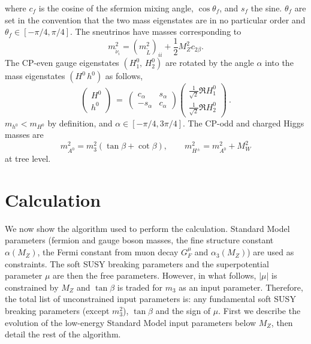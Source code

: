 \documentclass{article}
\def\half{\frac{1}{2}}
\begin{document}
%
where $c_f$ is the cosine of the sfermion mixing angle,
$\cos\theta_f$, and $s_f$ the sine. 
$\theta_f$ are set in the convention that the two mass eigenstates are in no
particular order and $\theta_f \in [-\pi/4, \pi/4]$. The sneutrinos have
masses corresponding to
\begin{equation}
m_{\tilde \nu_i}^2 = (m_{\tilde L}^2)_{ii} + \half M_Z^2 c_{2\beta}.
\end{equation}
The CP-even gauge eigenstates $(H_1^0,\, H_2^0)$ are rotated by the angle
$\alpha$ into the mass eigenstates $(H^0\, h^0)$ as follows,
%
\begin{equation}
\left(\begin{array}{c}H^0\\h^0\end{array}\right) \ =
\ \left(\begin{array}{cc} c_\alpha & s_\alpha\\-s_\alpha & c_\alpha
\end{array}\right)\left(\begin{array}{c} \frac{1}{\sqrt{2}} \Re  H_1^0
  \\\frac{1}{\sqrt{2}} \Re H_2^0\end{array}\right)~.
\label{rotateh}
\end{equation}
$m_{h^0} < m_{H^0}$ by
definition, and $\alpha \in [-\pi/4, 3 \pi/4]$.
The CP-odd and charged Higgs masses are
\begin{equation}
m_{A^0}^2 = m_3^2 (\tan \beta + \cot \beta),\qquad
m_{H^\pm}^2 = m_{A^0}^2 + M_W^2
\end{equation}
at tree level. 

\section{Calculation \label{sec:calculation}}

We now show the algorithm used to perform the calculation.
Standard Model parameters (fermion and gauge boson masses,
the fine structure constant $\alpha (M_Z)$, the Fermi constant from muon decay
$G_F^\mu$ and $\alpha_3(M_Z)$) are used as constraints. 
The soft SUSY breaking parameters and the superpotential parameter $\mu$ 
are then the free parameters. However, in what follows, $|\mu|$ is constrained
by $M_Z$ and $\tan \beta$ is traded for $m_3$ as an input parameter.
Therefore, the total list of unconstrained input parameters is: any
fundamental soft 
SUSY breaking parameters (except $m_3^2$), $\tan \beta$ and the sign
of $\mu$. 
First we describe the evolution of the low-energy Standard Model input
parameters below $M_Z$, then detail the rest of the algorithm.
\end{document}
